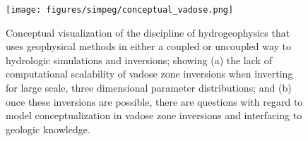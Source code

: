 \begin{figure}[!htbp]
\begin{center}
\texttt{[image: figures/simpeg/conceptual\_vadose.png]}
\end{center}
\caption{
Conceptual visualization of the discipline of hydrogeophysics that uses geophysical methods in either a coupled or uncoupled way to hydrologic simulations and inversions; showing (a) the lack of computational scalability of vadose zone inversions when inverting for large scale, three dimensional parameter distributions; and (b) once these inversions are possible, there are questions with regard to model conceptualization in vadose zone inversions and interfacing to geologic knowledge.
}
\label{fig:simpeg-conceptual_vadose}
\end{figure}
